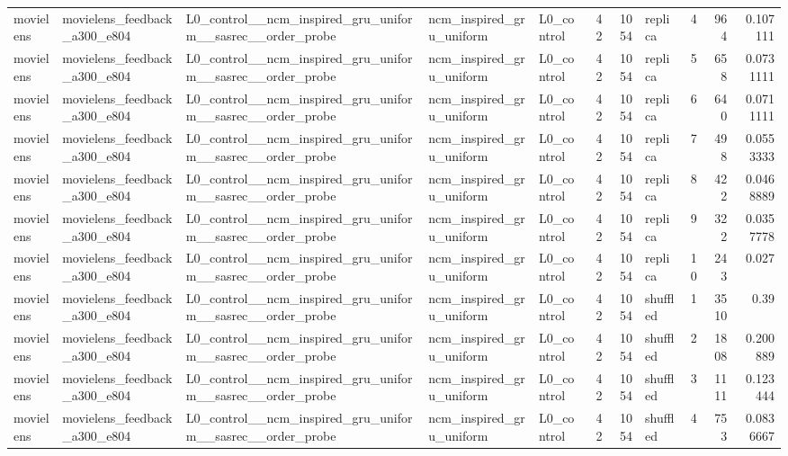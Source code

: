 \begin{table}[htbp!]
\begin{tabular}{lllllrrlrrr}
movielens & movielens\_feedback\_a300\_e804 & L0\_control\_\_ncm\_inspired\_gru\_uniform\_\_sasrec\_\_order\_probe & ncm\_inspired\_gru\_uniform & L0\_control & 42 & 1054 & replica & 4 & 964 & 0.107111 \\
movielens & movielens\_feedback\_a300\_e804 & L0\_control\_\_ncm\_inspired\_gru\_uniform\_\_sasrec\_\_order\_probe & ncm\_inspired\_gru\_uniform & L0\_control & 42 & 1054 & replica & 5 & 658 & 0.0731111 \\
movielens & movielens\_feedback\_a300\_e804 & L0\_control\_\_ncm\_inspired\_gru\_uniform\_\_sasrec\_\_order\_probe & ncm\_inspired\_gru\_uniform & L0\_control & 42 & 1054 & replica & 6 & 640 & 0.0711111 \\
movielens & movielens\_feedback\_a300\_e804 & L0\_control\_\_ncm\_inspired\_gru\_uniform\_\_sasrec\_\_order\_probe & ncm\_inspired\_gru\_uniform & L0\_control & 42 & 1054 & replica & 7 & 498 & 0.0553333 \\
movielens & movielens\_feedback\_a300\_e804 & L0\_control\_\_ncm\_inspired\_gru\_uniform\_\_sasrec\_\_order\_probe & ncm\_inspired\_gru\_uniform & L0\_control & 42 & 1054 & replica & 8 & 422 & 0.0468889 \\
movielens & movielens\_feedback\_a300\_e804 & L0\_control\_\_ncm\_inspired\_gru\_uniform\_\_sasrec\_\_order\_probe & ncm\_inspired\_gru\_uniform & L0\_control & 42 & 1054 & replica & 9 & 322 & 0.0357778 \\
movielens & movielens\_feedback\_a300\_e804 & L0\_control\_\_ncm\_inspired\_gru\_uniform\_\_sasrec\_\_order\_probe & ncm\_inspired\_gru\_uniform & L0\_control & 42 & 1054 & replica & 10 & 243 & 0.027 \\
movielens & movielens\_feedback\_a300\_e804 & L0\_control\_\_ncm\_inspired\_gru\_uniform\_\_sasrec\_\_order\_probe & ncm\_inspired\_gru\_uniform & L0\_control & 42 & 1054 & shuffled & 1 & 3510 & 0.39 \\
movielens & movielens\_feedback\_a300\_e804 & L0\_control\_\_ncm\_inspired\_gru\_uniform\_\_sasrec\_\_order\_probe & ncm\_inspired\_gru\_uniform & L0\_control & 42 & 1054 & shuffled & 2 & 1808 & 0.200889 \\
movielens & movielens\_feedback\_a300\_e804 & L0\_control\_\_ncm\_inspired\_gru\_uniform\_\_sasrec\_\_order\_probe & ncm\_inspired\_gru\_uniform & L0\_control & 42 & 1054 & shuffled & 3 & 1111 & 0.123444 \\
movielens & movielens\_feedback\_a300\_e804 & L0\_control\_\_ncm\_inspired\_gru\_uniform\_\_sasrec\_\_order\_probe & ncm\_inspired\_gru\_uniform & L0\_control & 42 & 1054 & shuffled & 4 & 753 & 0.0836667 \\

\end{tabular}
\end{table}
